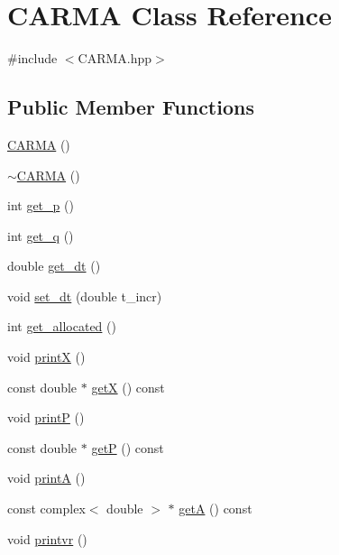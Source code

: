 \hypertarget{class_c_a_r_m_a}{\section{C\-A\-R\-M\-A Class Reference}
\label{class_c_a_r_m_a}
}


{\ttfamily \#include $<$C\-A\-R\-M\-A.\-hpp$>$}

\subsection*{Public Member Functions}
\begin{DoxyCompactItemize}
\item 
\hyperlink{class_c_a_r_m_a_a8871e02b301b503a987c03afc15c573c}{C\-A\-R\-M\-A} ()
\item 
\hyperlink{class_c_a_r_m_a_a19f2c3c41d81428c5f77a71f983dcc0b}{$\sim$\-C\-A\-R\-M\-A} ()
\item 
int \hyperlink{class_c_a_r_m_a_af758356c8aec7ea57d4edbd4c430c780}{get\-\_\-p} ()
\item 
int \hyperlink{class_c_a_r_m_a_aca44011b5238545f728d61d1cbbb72c2}{get\-\_\-q} ()
\item 
double \hyperlink{class_c_a_r_m_a_a56124e5b6da7bf480ab87edaf2b8520f}{get\-\_\-dt} ()
\item 
void \hyperlink{class_c_a_r_m_a_a08c525da441f05c0779182f32198acf6}{set\-\_\-dt} (double t\-\_\-incr)
\item 
int \hyperlink{class_c_a_r_m_a_a1ffb8686c5b54d9d4c76b2fd50a27a39}{get\-\_\-allocated} ()
\item 
void \hyperlink{class_c_a_r_m_a_a6df47e4eb5549a3108f7ec6a5e7821c2}{print\-X} ()
\item 
const double $\ast$ \hyperlink{class_c_a_r_m_a_ac1e451e382a60ab856edf63e70752074}{get\-X} () const 
\item 
void \hyperlink{class_c_a_r_m_a_a0281829307d89b518920f2a0be1c5686}{print\-P} ()
\item 
const double $\ast$ \hyperlink{class_c_a_r_m_a_a36df8bd666ea1b1ed984d5c34588e94b}{get\-P} () const 
\item 
void \hyperlink{class_c_a_r_m_a_aeecd124f696410809e879436b70af1ec}{print\-A} ()
\item 
const complex$<$ double $>$ $\ast$ \hyperlink{class_c_a_r_m_a_a1edafdc4cd83a2f7797daa212febc957}{get\-A} () const 
\item 
void \hyperlink{class_c_a_r_m_a_aec5cf02ae8c2b4d406e82c663fb69c42}{printvr} ()
\item 

\end{DoxyCompactItemize}
